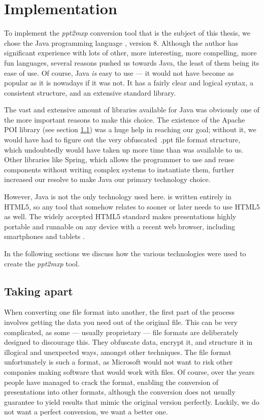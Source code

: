 
 \chapter{Implementation}
  \label{implementation}

  To implement the \emph{ppt2mxp} conversion tool that is the subject of this
  thesis, we chose the Java programming language \citep{gosling-1}, version 8.
  Although the author has significant experience with lots of other, more
  interesting, more compelling, more fun languages, several reasons pushed us
  towards Java, the least of them being its ease of use. Of course, Java
  \emph{is} easy to use --- it would not have become as popular as it is
  nowadays if it was not. It has a fairly clear and logical syntax, a consistent
  structure, and an extensive standard library.
 
  The vast and extensive amount of libraries available for Java was obviously
  one of the more important reasons to make this choice. The existence of the
  Apache POI library (see section \ref{poi}) was a huge help in reaching our
  goal; without it, we would have had to figure out the very obfuscated\ .ppt
  file format structure, which undoubtedly would have taken up more time than
  was available to us. Other libraries like Spring, which allows the programmer
  to use and reuse components without writing complex systems to instantiate
  them, further increased our resolve to make Java our primary technology
  choice.

  However, Java is not the only technology used here. \mxp is written entirely
  in HTML5, so any tool that somehow relates to \mxp sooner or later needs to
  use HTML5 as well. The widely accepted HTML5 standard makes \mxp
  presentations highly portable and runnable on any device with a recent web
  browser, including smartphones and tablets \citep{roels-1}.

  In the following sections we discuss how the various technologies were used
  to create the \emph{ppt2mxp} tool.

  \section{Taking \ppt apart}
   \label{poi}

   When converting one file format into another, the first part of the process
   involves getting the data you need out of the original file. This can be
   very complicated, as some --- usually proprietary --- file formats are
   deliberately designed to discourage this. They obfuscate data, encrypt it,
   and structure it in illogical and unexpected ways, amongst other techniques.
   The \ppt file format unfortunately is such a format, as Microsoft would not
   want to risk other companies making software that would work with \ppt
   files. Of course, over the years people have managed to crack the format,
   enabling the conversion of \ppt presentations into other formats, although
   the conversion does not usually guarantee to yield results that mimic the
   original version perfectly. Luckily, we do not want a perfect conversion, we
   want a better one.

